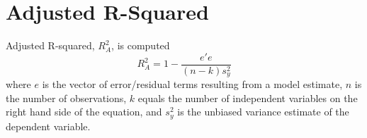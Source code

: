 \documentclass[12pt]{article}
\theoremstyle{plain}
\theoremstyle{definition}
\theoremstyle{remark}
\begin{document}
\section{Adjusted R-Squared}

Adjusted R-squared, $R^2_A$, is computed 
\[ R^2_A = 1 - \frac{e'e }{(n-k) s_y^2} \]
where $e$ is the vector of error/residual terms resulting from a 
model estimate,
$n$ is the number of observations, $k$ equals the number of 
independent variables on the right hand side of the equation, and
$s_y^2$ is the unbiased variance estimate of the dependent variable.
\end{document}
